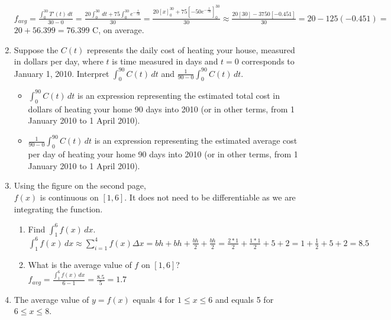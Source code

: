 \documentclass[10pt, letterpaper]{report}
\begin{document}
\begin{enumerate}
    $f_{avg}=\frac{\int_{0}^{30}{T'(t)}\,dt}{30-0}=
    \frac{20\int_{0}^{30}\,dt+75\int_{0}^{30}{e^{-\frac{t}{50}}}}{30}=
    \frac{20[x]_{0}^{30}+75[-50e^{-\frac{t}{50}}]_{0}^{30}}{30}\approx
    \frac{20[30]-3750[-0.451]}{30}=
    20-125(-0.451)=$ \\

    $20+56.399=76.399$ \degree C, on average. \\

\hline
  \item{Suppose the $C(t)$ represents the daily cost of heating your house, measured in dollars per day, where $t$ is time measured in days and $t=0$ corresponds to January 1, 2010. Interpret $\int_{0}^{90}{C(t)}\,dt$ and $\frac{1}{90-0}\int_{0}^{90}{C(t)}\,dt$.} \\
    \begin{itemize}
      \item{$\int_{0}^{90}{C(t)}\,dt$ is an expression representing the estimated total cost in dollars of heating your home 90 days into 2010 (or in other terms, from 1 January 2010 to 1 April 2010).} \\

      \item{$\frac{1}{90-0}\int_{0}^{90}{C(t)}\,dt$ is an expression representing the estimated average cost per day of heating your home 90 days into 2010 (or in other terms, from 1 January 2010 to 1 April 2010).} \\
    \end{itemize}
  \item{Using the figure on the second page,} \\

  $f(x)$ is continuous on $[1,6]$. It does not need to be differentiable as we are integrating the function. \\
    \begin{enumerate}
      \item{Find $\int_{1}^{6}{f(x)}\,dx$.} \\

        $\int_{1}^{6}{f(x)}\,dx\approx
        \sum_{i=1}^{4}{f(x)}\Delta x=
        bh+bh+\frac{bh}{2}+\frac{bh}{2}=
        \frac{2*1}{2}+\frac{1*1}{2}+5+2=
        1+\frac{1}{2}+5+2=8.5$ \\

      \item{What is the average value of $f$ on $[1,6]$?} \\

        $f_{avg}=\frac{\int_{1}^{6}{f(x)}\,dx}{6-1}=
        \frac{8.5}{5}=1.7$ \\
    \end{enumerate}
\hline
  \item{The average value of $y=f(x)$ equals 4 for $1\leq x\leq 6$ and equals 5 for $6\leq x\leq 8$. \\

}
\end{enumerate}
\end{document}
